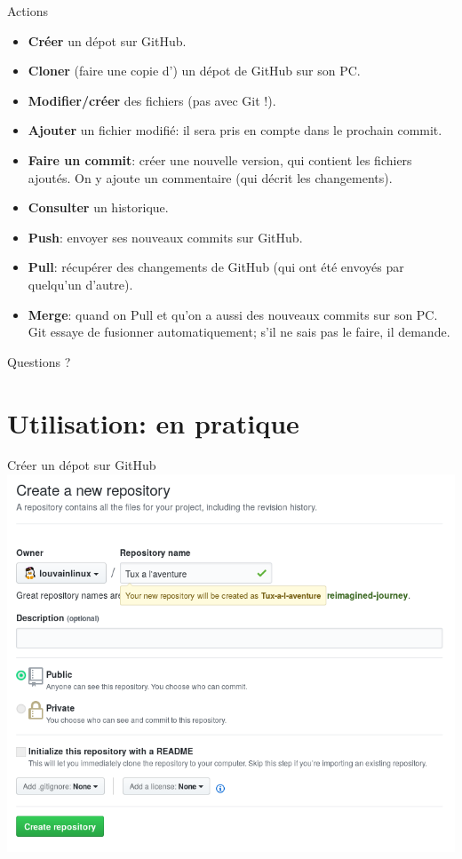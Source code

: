 \documentclass{beamer}
\begin{document}
\begin{frame}{Actions}
    \begin{itemize}
        \item \textbf{Créer} un dépot sur GitHub.
        \item \textbf{Cloner} (faire une copie d') un dépot de GitHub sur son PC.
        \item \textbf{Modifier/créer} des fichiers (pas avec Git !).
        \item \textbf{Ajouter} un fichier modifié: il sera pris en compte dans le
            prochain commit.
        \item \textbf{Faire un commit}: créer une nouvelle version, qui contient les
            fichiers ajoutés. On y ajoute un commentaire (qui décrit les
            changements).
        \item \textbf{Consulter} un historique.
        \item \textbf{Push}: envoyer ses nouveaux commits sur GitHub.
        \item \textbf{Pull}: récupérer des changements de GitHub (qui ont été envoyés
            par quelqu'un d'autre).
        \item \textbf{Merge}: quand on Pull et qu'on a aussi des nouveaux commits sur
            son PC. Git essaye de fusionner automatiquement; s'il ne sais pas
            le faire, il demande.
    \end{itemize}
\end{frame}

\begin{frame}[standout]
    Questions ?
\end{frame}


\section{Utilisation: en pratique}

\begin{frame}{Créer un dépot sur GitHub}
    \includegraphics[width=.9\textwidth]{img/github_desktop/new_repo.png}
\end{frame}
\end{document}
